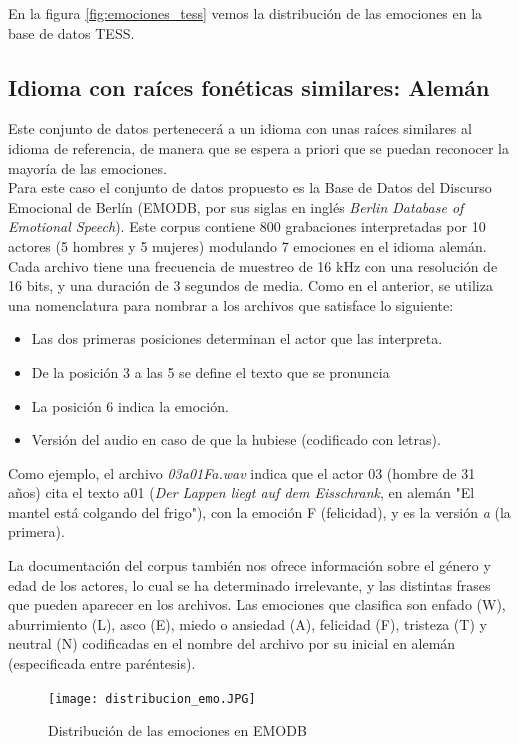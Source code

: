 \documentclass[11pt,a4paper,spanish]{book}
\begin{document}
	En la figura \ref{fig:emociones_tess} vemos la distribución de las emociones en la base de datos TESS.


	
	\subsection{Idioma con raíces fonéticas similares: Alemán} Este conjunto de datos pertenecerá a un idioma con unas raíces similares al idioma de referencia, de manera que se espera a priori que se puedan reconocer la mayoría de las emociones.\\
	
	Para este caso el conjunto de datos propuesto es la Base de Datos del Discurso Emocional de Berlín (EMODB, por sus siglas en inglés \emph{Berlin Database of Emotional Speech}). Este corpus contiene 800 grabaciones interpretadas por 10 actores (5 hombres y 5 mujeres) modulando 7 emociones en el idioma alemán. Cada archivo tiene una frecuencia de muestreo de 16 kHz con una resolución de 16 bits, y una duración de 3 segundos de media. Como en el anterior, se utiliza una nomenclatura para nombrar a los archivos que satisface lo siguiente:
	\begin{itemize}
		\item Las dos primeras posiciones determinan el actor que las interpreta.
		\item De la posición 3 a las 5 se define el texto que se pronuncia
		\item La posición 6 indica la emoción.
		\item Versión del audio en caso de que la hubiese (codificado con letras).
	\end{itemize}

	Como ejemplo, el archivo \emph{03a01Fa.wav} indica que el actor 03 (hombre de 31 años) cita el texto a01 (\emph{Der Lappen liegt auf dem Eisschrank}, en alemán "El mantel está colgando del frigo"), con la emoción F (felicidad), y es la versión \emph{a} (la primera).
	
	La documentación del corpus también nos ofrece información sobre el género y edad de los actores, lo cual se ha determinado irrelevante, y las distintas frases que pueden aparecer en los archivos.
	Las emociones que clasifica son enfado (W), aburrimiento (L), asco (E), miedo o ansiedad (A), felicidad (F), tristeza (T) y neutral (N) codificadas en el nombre del archivo por su inicial en alemán (especificada entre paréntesis).
	
	\begin{figure}[H]
		\centering
		\texttt{[image: distribucion\_emo.JPG]} 
		\caption{Distribución de las emociones en EMODB}
		\label{fig:emociones_emodb}
	\end{figure}
	
\end{document}
